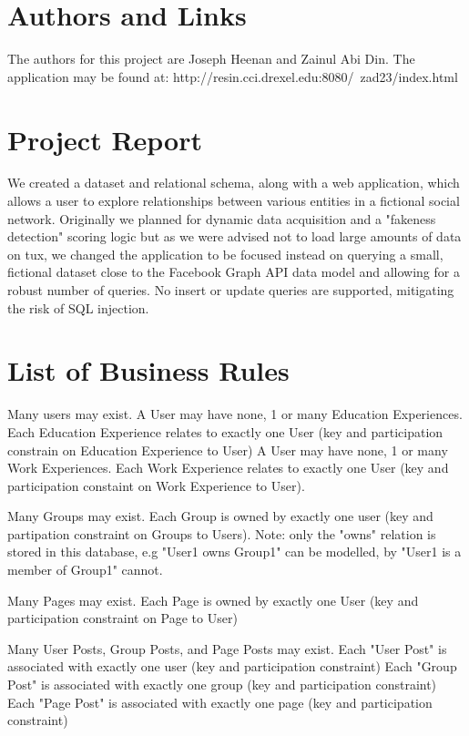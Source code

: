 \documentclass{article}
\begin{document}
\section{Authors and Links}

The authors for this project are Joseph Heenan and Zainul Abi Din. The application may be found at: http://resin.cci.drexel.edu:8080/~zad23/index.html

\section{Project Report}

We created a dataset and relational schema, along with a web application, which allows a user to explore relationships between various entities in a fictional social network. Originally we planned for dynamic data acquisition and a "fakeness detection" scoring logic but as we were advised not to load large amounts of data on tux, we changed the application to be focused instead on querying a small, fictional dataset close to the Facebook Graph API data model and allowing for a robust number of queries. No insert or update queries are supported, mitigating the risk of SQL injection.

\section{List of Business Rules}

Many users may exist.
A User may have none, 1 or many Education Experiences. Each Education Experience relates to exactly one User (key and participation constrain on Education Experience to User)
A User may have none, 1 or many Work Experiences. Each Work Experience relates to exactly one User (key and participation constaint on Work Experience to User).

Many Groups may exist. Each Group is owned by exactly one user (key and partipation constraint on Groups to Users). Note: only the "owns" relation is stored in this database, e.g "User1 owns Group1" can be modelled, by "User1 is a member of Group1" cannot.

Many Pages may exist. Each Page is owned by exactly one User (key and participation constraint on Page to User)

Many User Posts, Group Posts, and Page Posts may exist.
Each "User Post" is associated with exactly one user (key and participation constraint)
Each "Group Post" is associated with exactly one group (key and participation constraint)
Each "Page Post" is associated with exactly one page (key and participation constraint)
\end{document}
